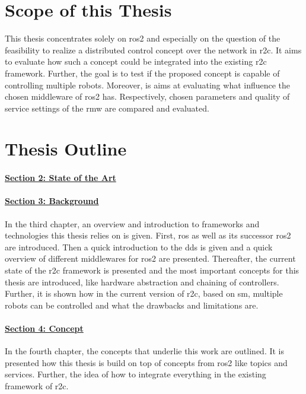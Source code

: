 \section{Scope of this Thesis}
This thesis concentrates solely on \gls{ros2} and especially on the question of the feasibility to realize a distributed control concept over the network in \gls{r2c}. It aims to evaluate how such a concept could be integrated into the existing \gls{r2c} framework. Further, the goal is to test if the proposed concept is capable of controlling multiple robots. Moreover, is aims at evaluating what influence the chosen middleware of \gls{ros2} has. Respectively, chosen parameters and quality of service settings of the \gls{rmw} are compared and evaluated.


\section{Thesis Outline}
\paragraph{\hyperref[sec:state_of_the_art]{Section 2: State of the Art}}

\paragraph{\hyperref[sec:background]{Section 3: Background}}
In the third chapter, an overview and introduction to frameworks and technologies this thesis relies on is given. First, \gls{ros} as well as its successor \gls{ros2} are introduced. Then a quick introduction to the \acrlong{dds} is given and a quick overview of different middlewares for \gls{ros2} are presented. Thereafter, the current state of the \gls{r2c} framework is presented and the most important concepts for this thesis are introduced, like hardware abstraction and chaining of controllers. Further, it is shown how in the current version of \gls{r2c}, based on \acrlong{sm}, multiple robots can be controlled and what the drawbacks and limitations are.
\paragraph{\hyperref[sec:concept]{Section 4: Concept}}
In the fourth chapter, the concepts that underlie this work are outlined. It is presented how this thesis is build on top of concepts from \gls{ros2} like \glspl{topic} and \glspl{service}. Further, the idea of how to integrate everything in the existing framework of \gls{r2c}.

